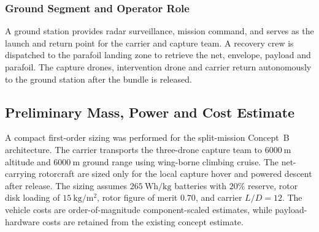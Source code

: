 \subsubsection{Ground Segment and Operator Role}

A  ground station provides radar surveillance, mission command, and serves as the launch and return point for the carrier and capture team. A recovery crew is dispatched to the parafoil landing zone to retrieve the net, envelope, payload and parafoil. The capture drones, intervention drone and carrier return autonomously to the ground station after the bundle is released.



 

%     

\subsection{Preliminary Mass, Power and Cost Estimate}

A compact first-order sizing was performed for the split-mission Concept~B architecture. The carrier transports the three-drone capture team to $6000~\mathrm{m}$ altitude and $6000~\mathrm{m}$ ground range using wing-borne climbing cruise. The net-carrying rotorcraft are sized only for the local capture hover and powered descent after release. The sizing assumes $265~\mathrm{Wh/kg}$ batteries with $20\%$ reserve, rotor disk loading of $15~\mathrm{kg/m^2}$, rotor figure of merit $0.70$, and carrier $L/D=12$. The vehicle costs are order-of-magnitude component-scaled estimates, while payload-hardware costs are retained from the existing concept estimate.

